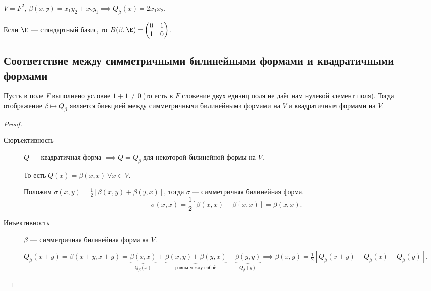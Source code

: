 \subsubsection{}

$V = F^2$, $\beta(x, y) = x_1 y_2 + x_2 y_1 \implies Q_\beta(x) = 2x_1 x_2$.

Если $\E$ --- стандартный базис, то $B(\beta, \E) = \begin{pmatrix} 0 & 1 \\ 1 & 0 \end{pmatrix}$.


\subsection{Соответствие между симметричными билинейными формами и квадратичными формами}

\begin{proposal}
    Пусть в поле $F$ выполнено условие $1 + 1 \neq 0$ (то есть в $F$ сложение двух единиц поля не даёт нам нулевой элемент поля). Тогда отображение $\beta \mapsto Q_\beta$ является биекцией между симметричными билинейными формами на $V$ и квадратичным формами на $V$.
\end{proposal}


\begin{proof}~
    \begin{description}
    \item[Сюръективность] $Q$ --- квадратичная форма $ \implies Q = Q_\beta$ для некоторой билинейной формы на $V$.

        То есть $Q(x) = \beta(x, x) \ \forall x \in V$.

        Положим $\sigma(x, y) = \frac{1}{2} \left[\beta(x, y) + \beta(y, x)\right]$, тогда $\sigma$ --- симметричная билинейная форма.
        \begin{equation*}
            \sigma(x, x) = \frac{1}{2}\left[\beta(x, x) + \beta(x, x)\right] = \beta(x, x)
        .\end{equation*}

    \item[Инъективность] $\beta$ --- симметричная билинейная форма на $V$.

        $Q_\beta(x + y) = \beta(x + y, x + y) = \underbrace{\beta(x, x)}_{Q_\beta(x)} + \underbrace{\beta(x, y) + \beta(y, x)}_{\text{равны между собой}} + \underbrace{\beta(y, y)}_{Q_\beta(y)} \implies \beta(x, y) = \frac{1}{2} \left[Q_\beta(x + y) - Q_\beta(x) - Q_\beta(y)\right]$.
    \end{description}
\end{proof}
